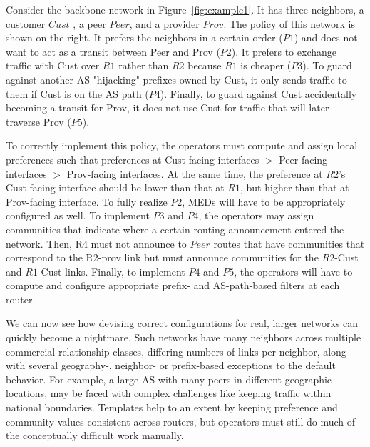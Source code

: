 Consider the backbone network in Figure~\ref{fig:example1}. It has three neighbors, a customer $Cust$ , a peer $Peer$, and a provider $Prov$. The policy of this network is shown on the right. It prefers the neighbors in a certain order ($P1$) and does not want to act as a transit between Peer and Prov ($P2$). It prefers to exchange traffic with Cust over $R1$ rather than $R2$ because $R1$ is cheaper ($P3$). To guard against another AS "hijacking" prefixes owned by Cust, it only sends traffic to them if Cust is on the AS path ($P4$). Finally, to guard against Cust accidentally becoming a transit for Prov, it does not use Cust for traffic that will later traverse Prov ($P5$).

To correctly implement this policy, the operators must compute and assign local preferences such that preferences at Cust-facing interfaces $>$ Peer-facing interfaces $>$ Prov-facing interfaces. At the same time, the preference at $R2$'s Cust-facing interface should be lower than that at $R1$, but higher than that at Prov-facing interface. To fully realize $P2$, MEDs will have to be appropriately configured as well. To implement $P3$ and $P4$, the operators may assign communities that indicate where a certain routing announcement entered the network. Then, R4 must not announce to $Peer$ routes that have communities that correspond to the R2-prov link but must announce communities for the $R2$-Cust and $R1$-Cust links. Finally, to implement $P4$ and $P5$, the operators will have to compute and configure appropriate prefix- and AS-path-based filters at each router.

We can now see how devising correct configurations for real, larger networks can quickly become a nightmare. Such networks have many neighbors across multiple commercial-relationship classes, differing numbers of links per neighbor, along with several geography-, neighbor- or prefix-based exceptions to the default behavior. For example, a large AS with many peers in different geographic locations, may be faced with complex challenges like keeping traffic within national boundaries.
Templates help to an extent by keeping preference and community values consistent across routers, but operators must still do much of the conceptually difficult work manually. 


